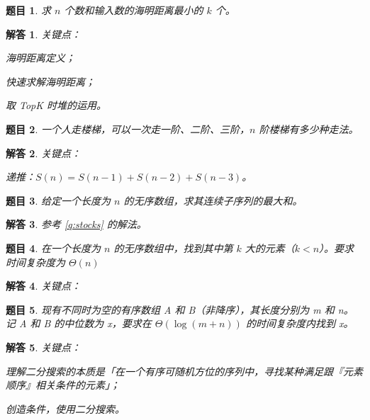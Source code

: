 \documentclass[UTF8, final]{ctexart}
\newtheorem{question}{题目}
\newtheorem{solution}{解答}
\begin{document}
\begin{question}
求 $n$ 个数和输入数的海明距离最小的 $k$ 个。
\end{question}
\begin{solution}
关键点：
\begin{compactitem}
    \item 海明距离定义；
    \item 快速求解海明距离；
    \item 取 TopK 时堆的运用。
\end{compactitem}

\end{solution}

\begin{question}
一个人走楼梯，可以一次走一阶、二阶、三阶，$n$ 阶楼梯有多少种走法。
\end{question}
\begin{solution}
关键点：
\begin{compactitem}
    \item 递推：$S(n) = S(n - 1) + S(n - 2) + S(n - 3)$。
\end{compactitem}

\end{solution}

\begin{question}
给定一个长度为 $n$ 的无序数组，求其连续子序列的最大和。
\end{question}
\begin{solution}
参考 \ref{q:stocks} 的解法。
\end{solution}

\begin{question}
在一个长度为 $n$ 的无序数组中，找到其中第 $k$ 大的元素（$k < n$）。要求时间复杂度为 $\Theta(n)$
\end{question}
\begin{solution}
关键点：
\end{solution}

\begin{question}
现有不同时为空的有序数组 A 和 B（非降序），其长度分别为 m 和 n。记 A 和 B 的中位数为 x，要求在 $\Theta(\log(m + n))$ 的时间复杂度内找到 x。
\end{question}
\begin{solution}
关键点：
\begin{compactitem}
\item 理解二分搜索的本质是「在一个有序可随机方位的序列中，寻找某种满足跟『元素顺序』相关条件的元素」；
\item 创造条件，使用二分搜索。
\end{compactitem}

\end{solution}
\end{document}
